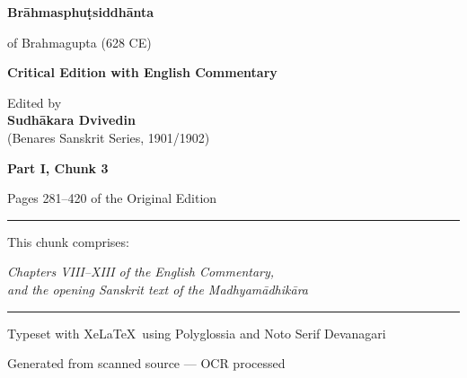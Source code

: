 \documentclass[11pt,a4paper]{article}
\providecommand{\XeLaTeX}{XeLaTeX}
\newcommand{\shortline}{\noindent\rule{0.5\textwidth}{0.4pt}\par}
\theoremstyle{definition}
\begin{document}
\begin{titlepage}
\centering
\vspace*{2cm}

{\Huge\bfseries\color{titlecolor} Br\=ahmasphu\d{t}siddh\=anta}

\vspace{0.5cm}
{\Large\color{sectioncolor} of Brahmagupta (628 CE)}

\vspace{2cm}
{\LARGE\bfseries Critical Edition with English Commentary}

\vspace{1.5cm}
{\Large Edited by\\[0.3cm]
\textbf{Sudh\=akara Dvivedin}\\[0.2cm]
(Benares Sanskrit Series, 1901/1902)}

\vspace{2cm}
{\Large\bfseries\color{sectioncolor} Part I, Chunk 3}

\vspace{0.5cm}
{\large Pages 281--420 of the Original Edition}

\vspace{1cm}
\shortline

\vspace{0.5cm}
{\normalsize This chunk comprises:}

\vspace{0.3cm}
\begin{minipage}{0.8\textwidth}
\centering
\textit{Chapters VIII--XIII of the English Commentary,}\\[0.2cm]
\textit{and the opening Sanskrit text of the Madhyam\=adhik\=ara}
\end{minipage}

\vspace{1cm}
\shortline

\vspace{0.5cm}
{\small Typeset with \XeLaTeX\ using Polyglossia and Noto Serif Devanagari}

\vfill
{\small Generated from scanned source --- OCR processed}

\end{titlepage}

\tableofcontents
\newpage
\end{document}
